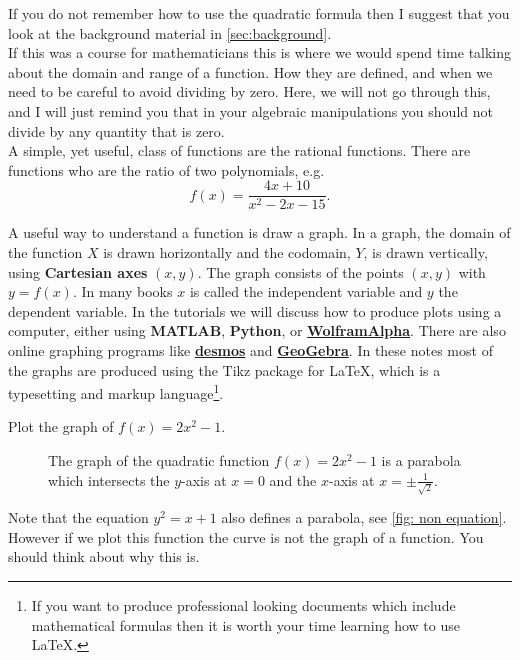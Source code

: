 If you do not remember how to use the quadratic formula then I suggest that you look at the background material in \cref{sec:background}.\\

If this was a course for mathematicians this is where we would spend time talking about the domain and range of a function. How they are defined, and when we need to be careful to avoid dividing by zero. Here, we will not go through this, and I will just remind you that in your algebraic manipulations you should not divide by any quantity that is zero.\\

A simple, yet useful, class of functions are the rational functions. There are functions who are the ratio of two polynomials, e.g. 
\begin{equation*}
f(x)=\frac{4x+10}{x^{2}-2x-15}.
\end{equation*}

A useful way to understand a function is draw a graph. In a graph, the domain of the function $X$ is drawn horizontally and the codomain, $Y$, is drawn vertically, using \textbf{\gls{Cartesian} axes} $(x,y)$. The graph consists of the points $(x,y)$ with $y=f(x)$. In many books $x$ is called the independent variable and $y$ the dependent variable. In the tutorials we will discuss how to produce plots using a computer, either using \textbf{MATLAB}, \textbf{Python}, or \href{https://www.wolframalpha.com/}{\textbf{WolframAlpha}}. There are also online graphing programs like \href{https://www.desmos.com/}{\textbf{desmos}} and \href{https://www.geogebra.org/}{\textbf{GeoGebra}}. In these notes most of the graphs are produced using the Tikz package for \LaTeX{}, which is a typesetting and markup language\footnote{If you want to produce professional looking documents which include mathematical formulas then it is worth your time learning how to use \LaTeX{}.}.

\begin{ex}
Plot the graph of $f(x)=2x^{2}-1$.\\
\begin{figure}[htbp]
    \begin{center}
    \caption{The graph of the quadratic function  $f(x)=2x^{2}-1$ is a parabola which intersects the $y$-axis at $x=0$ and the $x$-axis at $x=\pm\frac{1}{\sqrt{2}}$.}
        \label{fig: quadratic function graph}
\end{center}
\end{figure}
\end{ex}
Note that the equation $y^{2}=x+1$ also defines a parabola, see \cref{fig: non equation}. However if we plot this function the curve is not the graph of a function. You should think about why this is.

